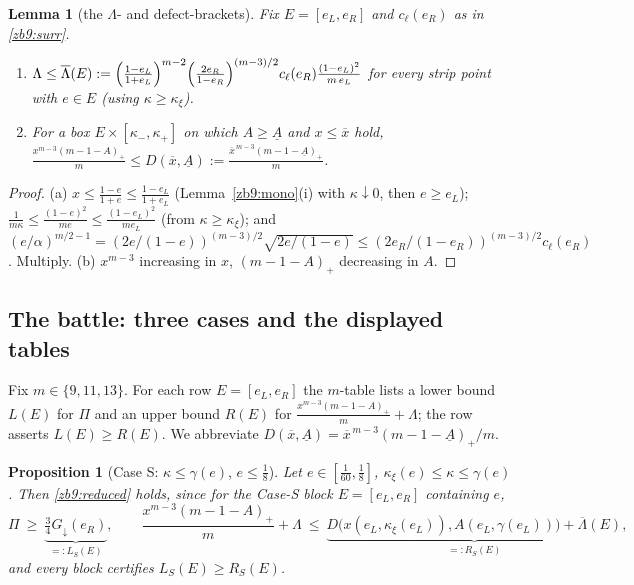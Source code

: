 \documentclass[11pt]{amsart}
\newtheorem{lemma}[theorem]{Lemma}
\newtheorem{proposition}[theorem]{Proposition}
\newcommand{\kxi}{\kappa_\xi}
\begin{document}
\begin{lemma}[the $\Lambda$- and defect-brackets]\label{zb9:brk}
Fix $E=[e_L,e_R]$ and $c_\ell(e_R)$ as in \eqref{zb9:surr}.
\begin{enumerate}[label=\textup{(\alph*)},itemsep=1pt]
\item $\displaystyle
\Lambda\le\overline\Lambda(E):=\Bigl(\tfrac{1-e_L}{1+e_L}\Bigr)^{m-2}
\Bigl(\tfrac{2e_R}{1-e_R}\Bigr)^{(m-3)/2}c_\ell(e_R)\tfrac{(1-e_L)^2}{m\,e_L}$
for every strip point with $e\in E$ (using $\kappa\ge\kxi$).
\item For a box $E\times[\kappa_-,\kappa_+]$ on which $A\ge\underline A$ and
$x\le\overline x$ hold,
$\tfrac{x^{m-3}(m-1-A)_+}{m}\le D(\overline x,\underline A)
:=\tfrac{\overline x^{\,m-3}(m-1-\underline A)_+}{m}$.
\end{enumerate}
\end{lemma}

\begin{proof}
(a) $x\le\tfrac{1-e}{1+e}\le\tfrac{1-e_L}{1+e_L}$
(Lemma~\ref{zb9:mono}(i) with $\kappa\downarrow0$, then $e\ge e_L$);
$\tfrac1{m\kappa}\le\tfrac{(1-e)^2}{me}\le\tfrac{(1-e_L)^2}{me_L}$ (from
$\kappa\ge\kxi$); and
$(e/\alpha)^{m/2-1}=(2e/(1-e))^{(m-3)/2}\sqrt{2e/(1-e)}\le(2e_R/(1-e_R))^{(m-3)/2}c_\ell(e_R)$.
Multiply.  (b) $x^{m-3}$ increasing in $x$, $(m-1-A)_+$ decreasing in $A$.
\end{proof}

\subsection*{The battle: three cases and the displayed tables}
Fix $m\in\{9,11,13\}$.  For each row $E=[e_L,e_R]$ the $m$-table lists a lower
bound $L(E)$ for $\Pi$ and an upper bound $R(E)$ for
$\tfrac{x^{m-3}(m-1-A)_+}{m}+\Lambda$; the row asserts $L(E)\ge R(E)$.  We
abbreviate $D(\overline x,\underline A)=\overline x^{\,m-3}(m-1-\underline A)_+/m$.

\begin{proposition}[Case S: $\kappa\le\gamma(e)$, $e\le\tfrac18$]\label{zb9:caseS}
Let $e\in[\tfrac1{60},\tfrac18]$, $\kxi(e)\le\kappa\le\gamma(e)$.  Then
\eqref{zb9:reduced} holds, since for the Case-S block $E=[e_L,e_R]$ containing
$e$,
\[
 \Pi\ \ge\ \underbrace{\tfrac34 G_\downarrow(e_R)}_{=:L_S(E)},\qquad
 \frac{x^{m-3}(m-1-A)_+}{m}+\Lambda\ \le\
 \underbrace{D\bigl(x(e_L,\kxi(e_L)),A(e_L,\gamma(e_L))\bigr)+\overline\Lambda(E)}_{=:R_S(E)},
\]
and every block certifies $L_S(E)\ge R_S(E)$.
\end{proposition}
\end{document}
